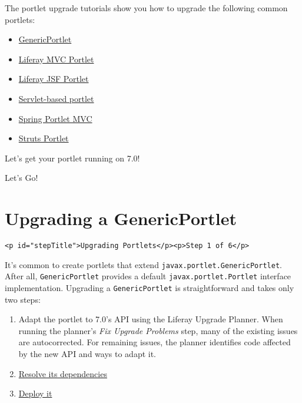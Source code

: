 The portlet upgrade tutorials show you how to upgrade the following
common portlets:

\begin{itemize}
\tightlist
\item
  \href{/docs/7-2/tutorials/-/knowledge_base/t/upgrading-a-genericportlet}{GenericPortlet}
\item
  \href{/docs/7-2/tutorials/-/knowledge_base/t/upgrading-a-liferay-mvc-portlet}{Liferay
  MVC Portlet}
\item
  \href{/docs/7-2/tutorials/-/knowledge_base/t/upgrading-a-liferay-jsf-portlet}{Liferay
  JSF Portlet}
\item
  \href{/docs/7-2/tutorials/-/knowledge_base/t/upgrading-a-servlet-based-portlet}{Servlet-based
  portlet}
\item
  \href{/docs/7-2/tutorials/-/knowledge_base/t/upgrading-a-spring-portlet-mvc-portlet}{Spring
  Portlet MVC}
\item
  \href{/docs/7-2/tutorials/-/knowledge_base/t/upgrading-a-struts-1-portlet}{Struts
  Portlet}
\end{itemize}

Let's get your portlet running on 7.0!

Let's Go!{}

\chapter{Upgrading a GenericPortlet}\label{upgrading-a-genericportlet}

\begin{verbatim}
<p id="stepTitle">Upgrading Portlets</p><p>Step 1 of 6</p>
\end{verbatim}

It's common to create portlets that extend
\texttt{javax.portlet.GenericPortlet}. After all,
\texttt{GenericPortlet} provides a default
\texttt{javax.portlet.Portlet} interface implementation. Upgrading a
\texttt{GenericPortlet} is straightforward and takes only two steps:

\begin{enumerate}
\def\labelenumi{\arabic{enumi}.}
\item
  Adapt the portlet to 7.0's API using the Liferay Upgrade Planner. When
  running the planner's \emph{Fix Upgrade Problems} step, many of the
  existing issues are autocorrected. For remaining issues, the planner
  identifies code affected by the new API and ways to adapt it.
\item
  \href{/docs/7-2/tutorials/-/knowledge_base/t/resolving-a-projects-dependencies}{Resolve
  its dependencies}
\item
  \href{/docs/7-2/reference/-/knowledge_base/r/deploying-a-project}{Deploy
  it}
\end{enumerate}

